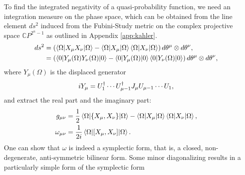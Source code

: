 To find the integrated negativity of a quasi-probability function, we need an integration measure on the phase space, which can be obtained from the line element $ds^2$ induced from the Fubini-Study metric on the complex projective space $\mathbb{C}P^{2^n-1}$ as outlined in Appendix \ref{app:kahler}.
\begin{align}
ds^2 &= \left( \braket{\Omega |X_{\mu} X_{\nu}| \Omega} - \braket{\Omega | X_{\mu} | \Omega} \braket{\Omega | X_{\nu} | \Omega} \right) d\theta^{\mu} \otimes d\theta^{\nu}, \\
	&=  \left( \braket{0|Y_{\mu}(\Omega) Y_{\nu}(\Omega)|0} - \braket{0| Y_{\mu}(\Omega) |0} \braket{0| Y_{\nu}(\Omega) |0} \right) d\theta^{\mu} \otimes d\theta^{\nu},
\end{align}
where $Y_{\mu}(\Omega)$ is the displaced generator
\begin{align}
i Y_{\mu} = U_1^{\dagger} \cdots U_{\mu-1}^{\dagger} J_{\mu} U_{\mu-1} \cdots U_1,
\end{align}
and extract the real part and the imaginary part:
\begin{align}
	g_{\mu\nu} &= \frac{1}{2} \braket{\Omega | \{X_{\mu}, X_{\nu}\} | \Omega} - \braket{\Omega | X_{\mu} | \Omega} \braket{\Omega | X_{\nu} | \Omega}, \\
	\omega_{\mu\nu} &= \frac{1}{2i} \braket{\Omega | [X_{\mu}, X_{\nu}] | \Omega}.
\end{align}
One can show that $\omega$ is indeed a symplectic form, that is, a closed, non-degenerate, anti-symmetric bilinear form. Some minor diagonalizing results in a particularly simple form of the symplectic form
